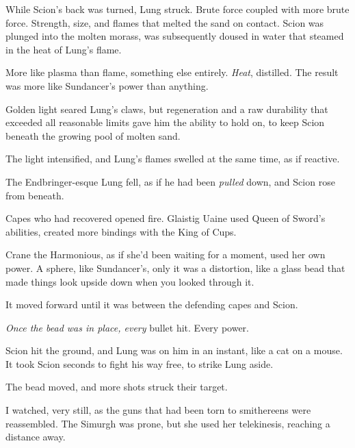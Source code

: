 While Scion's back was turned, Lung struck.  Brute force coupled with more brute force.  Strength, size, and flames that melted the sand on contact.  Scion was plunged into the molten morass, was subsequently doused in water that steamed in the heat of Lung's flame.



More like plasma than flame, something else entirely.  \emph{Heat}, distilled.  The result was more like Sundancer's power than anything.



Golden light seared Lung's claws, but regeneration and a raw durability that exceeded all reasonable limits gave him the ability to hold on, to keep Scion beneath the growing pool of molten sand.



The light intensified, and Lung's flames swelled at the same time, as if reactive.



The Endbringer-esque Lung fell, as if he had been \emph{pulled} down, and Scion rose from beneath.



Capes who had recovered opened fire.  Glaistig Uaine used Queen of Sword's abilities, created more bindings with the King of Cups.



Crane the Harmonious, as if she'd been waiting for a moment, used her own power.  A sphere, like Sundancer's, only it was a distortion, like a glass bead that made things look upside down when you looked through it.



It moved forward until it was between the defending capes and Scion.



\emph{Once the bead was in place, every} bullet hit.  Every power.



Scion hit the ground, and Lung was on him in an instant, like a cat on a mouse.  It took Scion seconds to fight his way free, to strike Lung aside.



The bead moved, and more shots struck their target.



I watched, very still, as the guns that had been torn to smithereens were reassembled.  The Simurgh was prone, but she used her telekinesis, reaching a distance away.



